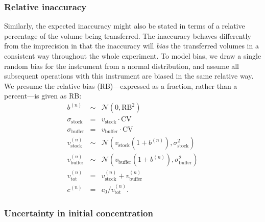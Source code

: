 \documentclass[aps,pre,twocolumn,nofootinbib,superscriptaddress,linenumbers]{revtex4-1}
\begin{document}
\subsubsection*{Relative inaccuracy}

Similarly, the expected inaccuracy might also be stated in terms of a relative percentage of the volume being transferred.
The inaccuracy behaves differently from the imprecision in that the inaccuracy will \emph{bias} the transferred volumes in a consistent way throughout the whole experiment.
To model bias, we draw a single random bias for the instrument from a normal distribution, and assume all subsequent operations with this instrument are biased in the same relative way.
We presume the relative bias (RB)---expressed as a fraction, rather than a percent---is given as RB:
\begin{eqnarray}
b^{(n)} &\sim& \mathcal{N}(0, \mathrm{RB}^2) \nonumber \\
\sigma_\mathrm{stock} &=& v_\mathrm{stock} \cdot \mathrm{CV} \nonumber \\
\sigma_\mathrm{buffer} &=& v_\mathrm{buffer} \cdot \mathrm{CV} \nonumber \\
v_\mathrm{stock}^{(n)} &\sim& \mathcal{N}(v_\mathrm{stock} (1 + b^{(n)}) , \sigma_\mathrm{stock}^2) \nonumber \\
v_\mathrm{buffer}^{(n)} &\sim& \mathcal{N}(v_\mathrm{buffer} (1 + b^{(n)}), \sigma_\mathrm{buffer}^2) \nonumber \\
v_\mathrm{tot}^{(n)} &=& v_\mathrm{stock}^{(n)} + v_\mathrm{buffer}^{(n)} \nonumber \\
c^{(n)} &=& c_0 / v_\mathrm{tot}^{(n)} .
\end{eqnarray}

\subsubsection*{Uncertainty in initial concentration}
\end{document}
